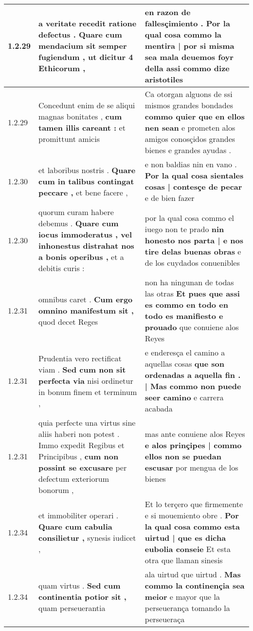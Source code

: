 \begin{tabular}{|p{1cm}|p{6.5cm}|p{6.5cm}|}
1.2.29 & a veritate recedit ratione defectus . \textbf{ Quare cum mendacium sit semper fugiendum , } ut dicitur 4 Ethicorum , & en razon de fallesçimiento . \textbf{ Por la qual cosa commo la mentira | por si misma sea mala deuemos foyr della } assi commo dize aristotiles \\\hline
1.2.29 & Concedunt enim de se aliqui magnas bonitates , \textbf{ cum tamen illis careant : } et promittunt amicis & Ca otorgan alguons de ssi mismos grandes bondades \textbf{ commo quier que en ellos nen sean } e prometen alos amigos conosçidos grandes bienes e grandes ayudas . \\\hline
1.2.30 & et laboribus nostris . \textbf{ Quare cum in talibus contingat peccare , } et bene facere , & e non baldias nin en vano . \textbf{ Por la qual cosa sientales cosas | contesçe de pecar } e de bien fazer \\\hline
1.2.30 & quorum curam habere debemus . \textbf{ Quare cum iocus immoderatus , vel inhonestus distrahat nos a bonis operibus , } et a debitis curis : & por la qual cosa commo el iuego non te prado \textbf{ nin honesto nos parta | e nos tire delas buenas obras } e de los cuydados conuenibles \\\hline
1.2.31 & omnibus caret . \textbf{ Cum ergo omnino manifestum sit , } quod decet Reges & non ha ningunan de todas las otras \textbf{ Et pues que assi es commo en todo en todo es manifiesto e prouado } que conuiene alos Reyes \\\hline
1.2.31 & Prudentia vero rectificat viam . \textbf{ Sed cum non sit perfecta via } nisi ordinetur in bonum finem et terminum , & e enderesça el camino a aquellas cosas \textbf{ que son ordenadas a aquella fin . | Mas commo non puede seer camino } e carrera acabada \\\hline
1.2.31 & quia perfecte una virtus sine aliis haberi non potest . Immo expedit Regibus et Principibus , \textbf{ cum non possint se excusare } per defectum exteriorum bonorum , & mas ante conuiene alos Reyes \textbf{ e alos prinçipes | commo ellos non se puedan escusar } por mengua de los bienes \\\hline
1.2.34 & et immobiliter operari . \textbf{ Quare cum cabulia consilietur , } synesis iudicet , & Et lo terçero que firmemente e si mouemiento obre . \textbf{ Por la qual cosa commo esta uirtud | que es dicha eubolia conseie } Et esta otra que llaman sinesis \\\hline
1.2.34 & quam virtus . \textbf{ Sed cum continentia potior sit , } quam perseuerantia & ala uirtud que uirtud . \textbf{ Mas commo la continençia sea meior } e mayor que la perseuerança tomando la perseueraça \\\hline

\end{tabular}

